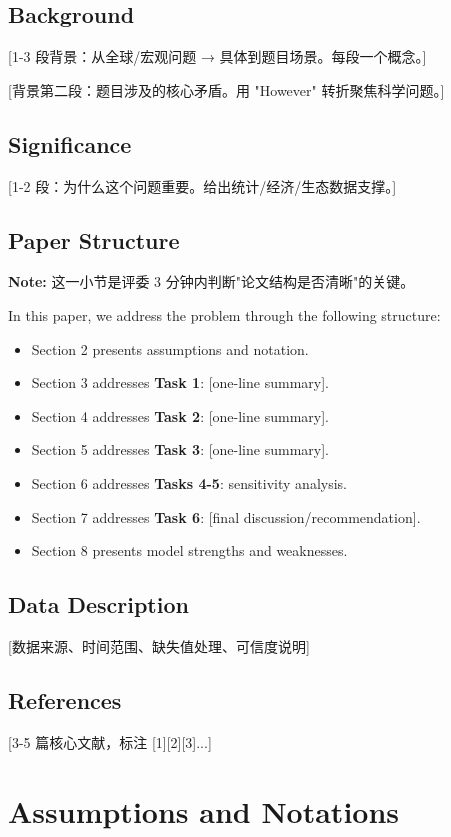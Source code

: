 \documentclass[12pt]{article}
\begin{document}
\subsection{Background}
[1-3 段背景：从全球/宏观问题 → 具体到题目场景。每段一个概念。]

[背景第二段：题目涉及的核心矛盾。用 "However" 转折聚焦科学问题。]

\subsection{Significance}
[1-2 段：为什么这个问题重要。给出统计/经济/生态数据支撑。]

\subsection{Paper Structure}
\textbf{Note:} 这一小节是评委 3 分钟内判断"论文结构是否清晰"的关键。

In this paper, we address the problem through the following structure:
\begin{itemize}[leftmargin=*]
    \item Section 2 presents assumptions and notation.
    \item Section 3 addresses \textbf{Task 1}: [one-line summary].
    \item Section 4 addresses \textbf{Task 2}: [one-line summary].
    \item Section 5 addresses \textbf{Task 3}: [one-line summary].
    \item Section 6 addresses \textbf{Tasks 4-5}: sensitivity analysis.
    \item Section 7 addresses \textbf{Task 6}: [final discussion/recommendation].
    \item Section 8 presents model strengths and weaknesses.
\end{itemize}

\subsection{Data Description}
[数据来源、时间范围、缺失值处理、可信度说明]

\subsection{References}
[3-5 篇核心文献，标注 [1][2][3]...]

\section{Assumptions and Notations}
\end{document}
